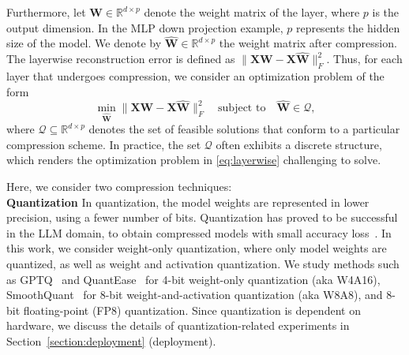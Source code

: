 Furthermore, let $\mathbf{W} \in \mathbb{R}^{d \times p}$
denote the weight matrix of the layer, where \( p \) is the output dimension. In the MLP down projection example, \( p \) represents the hidden size of the model. We denote by
$\hat{\mathbf{W}} \in \mathbb{R}^{d \times p}$
the weight matrix after compression. The layerwise reconstruction error is defined as
$\|\mathbf{X}\mathbf{W} - \mathbf{X}\hat{\mathbf{W}}\|_F^2.$
Thus, for each layer that undergoes compression, we consider an optimization problem of the form
\begin{equation}\label{eq:layerwise}
\min_{\hat{\mathbf{W}}} \|\mathbf{X}\mathbf{W} - \mathbf{X}\hat{\mathbf{W}}\|_F^2 \quad \text{subject to} \quad \hat{\mathbf{W}} \in \mathcal{Q},
\end{equation}
where \( \mathcal{Q} \subseteq \mathbb{R}^{d \times p} \) denotes the set of feasible solutions that conform to a particular compression scheme. In practice, the set \( \mathcal{Q} \) often exhibits a discrete structure, which renders the optimization problem in \eqref{eq:layerwise} challenging to solve.

Here, we consider two compression techniques: \\
\noindent\textbf{Quantization} In quantization, the model weights are represented in lower precision, using a fewer number of bits. Quantization has proved to be successful in the LLM domain, to obtain compressed models with small accuracy loss~\cite{frantar2022gptq,smoothquant}. In this work, we consider weight-only quantization, where only model weights are quantized, as well as weight and activation quantization. We study methods such as GPTQ~\cite{frantar2022gptq} and QuantEase~\cite{behdin2023quantease} for 4-bit weight-only quantization (aka W4A16), SmoothQuant~\cite{smoothquant} for 8-bit weight-and-activation quantization (aka W8A8), and 8-bit floating-point (FP8) quantization. Since quantization is dependent on hardware, we discuss the details of quantization-related experiments in Section~\ref{section:deployment} (deployment).

